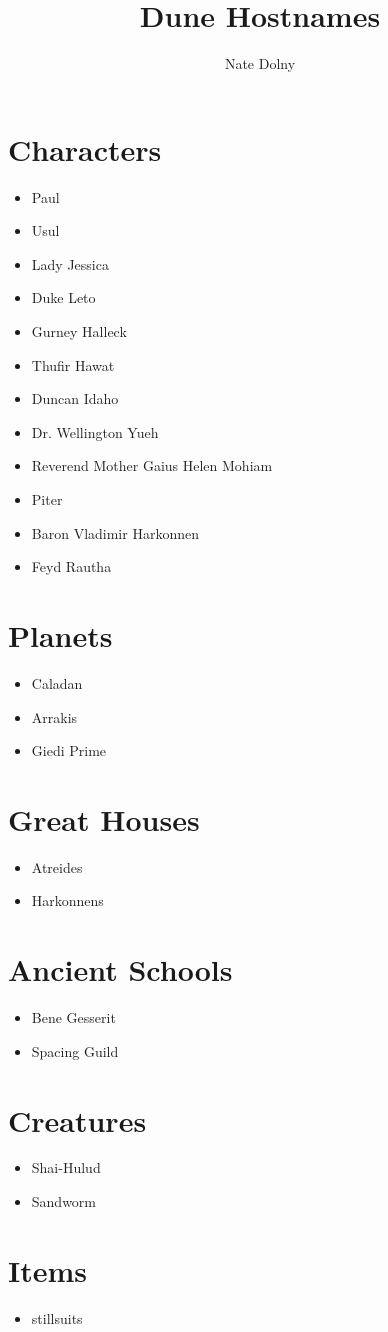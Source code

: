 \documentclass{article}
\title{\textbf{Dune Hostnames}}
\author{Nate Dolny}
\date{}
\begin{document}
\maketitle

\section{Characters}
\begin{itemize}
\item Paul
\item Usul
\item Lady Jessica
\item Duke Leto
\item Gurney Halleck 
\item Thufir Hawat
\item Duncan Idaho 
\item Dr. Wellington Yueh
\item Reverend Mother Gaius Helen Mohiam
\item Piter
\item Baron Vladimir Harkonnen 
\item Feyd Rautha
\end{itemize}

\section{Planets}
\begin{itemize}
\item Caladan 
\item Arrakis
\item Giedi Prime
\end{itemize}

\section{Great Houses}
\begin{itemize}
\item Atreides 
\item Harkonnens
\end{itemize}

\section{Ancient Schools}
\begin{itemize}
\item Bene Gesserit 
\item Spacing Guild
\end{itemize}

\section{Creatures}
\begin{itemize}
\item Shai-Hulud
\item Sandworm 
\end{itemize}

\section{Items}
\begin{itemize}
\item stillsuits
\end{itemize}
\end{document}
